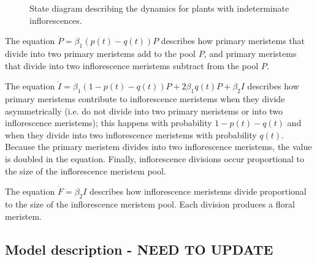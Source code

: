 \documentclass[12pt, oneside]{article}   	%
\begin{document}
\begin{figure}[hbt!]
\centering
{}
  \caption{State diagram describing the dynamics for plants with indeterminate inflorescences.}
  \label{fig:state-indeterminate}
\end{figure}

The equation $\dot{P}  = \beta_1 (p(t) - q(t)) P$ describes how primary meristems that divide into two primary meristems add to the pool $P$, and primary meristems that divide into two inflorescence meristems subtract from the pool $P$. 

The equation $\dot{I} = \beta_1 (1-p(t)- q(t) ) P + 2 \beta_1 q(t) P + \beta_2 I $ describes how primary meristems contribute to inflorescence meristems when they divide asymmetrically (i.e. do not divide into two primary meristems or into two inflorescence meristems); this happens with probability $1-p(t)-q(t)$ and when they divide into two inflorescence meristems with probability $q(t)$. Because the primary meristem divides into two inflorescence meristems, the value is doubled in the equation. Finally, inflorescence divisions occur proportional to the size of the inflorescence meristem pool.

The equation $\dot{F} = \beta_2 I$ describes how inflorescence meristems divide proportional to the size of the inflorescence meristem pool. Each division produces a floral meristem.

\subsection{Model description - NEED TO UPDATE}
\end{document}
